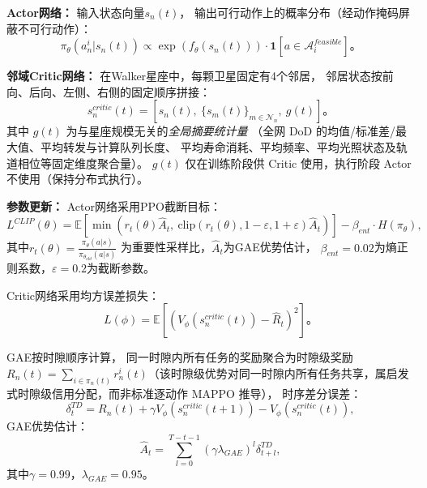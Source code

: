 \documentclass[a4paper,11pt]{article}
\begin{document}
\textbf{Actor网络：}
输入状态向量$s_n(t)$，
输出可行动作上的概率分布（经动作掩码屏蔽不可行动作）：
\begin{equation}
\pi_\theta(a^i_n | s_n(t))
\propto \exp(f_\theta(s_n(t)))
\cdot \mathbf{1}[a \in \mathcal{A}^{feasible}_i]。
\label{eq:actor}
\end{equation}

\textbf{邻域Critic网络：}
在Walker星座中，每颗卫星固定有4个邻居，
邻居状态按前向、后向、左侧、右侧的固定顺序拼接：
\begin{equation}
s^{critic}_n(t) = [s_n(t),\
\{s_m(t)\}_{m \in \mathcal{N}_n},\ g(t)]。
\label{eq:critic_input}
\end{equation}
其中 $g(t)$ 为与星座规模无关的\emph{全局摘要统计量}
（全网 DoD 的均值/标准差/最大值、平均转发与计算队列长度、
平均寿命消耗、平均频率、平均光照状态及轨道相位等固定维度聚合量）。
$g(t)$ 仅在训练阶段供 Critic 使用，执行阶段 Actor 不使用（保持分布式执行）。

\textbf{参数更新：}
Actor网络采用PPO截断目标：
\begin{equation}
L^{CLIP}(\theta) = \mathbb{E}\left[
\min\left(r_t(\theta)\hat{A}_t,\
\text{clip}(r_t(\theta), 1-\varepsilon, 1+\varepsilon)\hat{A}_t
\right)
\right] - \beta_{ent}\cdot H(\pi_\theta),
\label{eq:ppo}
\end{equation}
其中$r_t(\theta) = \frac{\pi_\theta(a|s)}{\pi_{\theta_{old}}(a|s)}$
为重要性采样比，$\hat{A}_t$为GAE优势估计，
$\beta_{ent}=0.02$为熵正则系数，$\varepsilon=0.2$为截断参数。

Critic网络采用均方误差损失：
\begin{equation}
L(\phi) = \mathbb{E}\left[
(V_\phi(s^{critic}_n(t)) - \hat{R}_t)^2
\right]。
\label{eq:critic_loss}
\end{equation}

GAE按时隙顺序计算，
同一时隙内所有任务的奖励聚合为时隙级奖励
$R_n(t) = \sum_{i \in \pi_n(t)} r^i_n(t)$（该时隙级优势对同一时隙内所有任务共享，属启发式时隙级信用分配，而非标准逐动作 MAPPO 推导），
时序差分误差：
\begin{equation}
\delta^{TD}_t = R_n(t) + \gamma V_\phi(s^{critic}_n(t+1))
- V_\phi(s^{critic}_n(t)),
\label{eq:td_error}
\end{equation}
GAE优势估计：
\begin{equation}
\hat{A}_t = \sum_{l=0}^{T-t-1}
(\gamma\lambda_{GAE})^l\delta^{TD}_{t+l},
\label{eq:gae}
\end{equation}
其中$\gamma=0.99$，$\lambda_{GAE}=0.95$。

\end{document}
